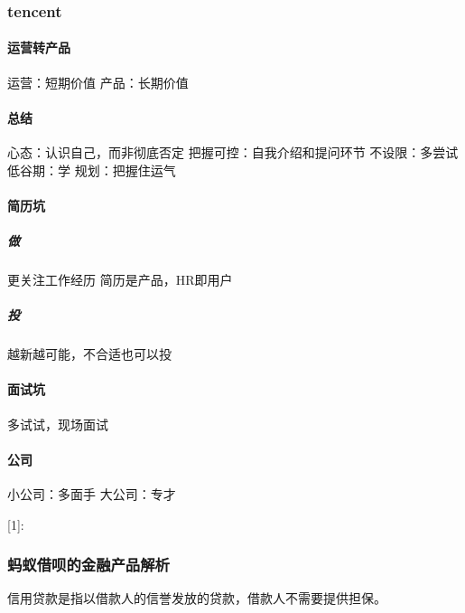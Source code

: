 \documentclass[letterpaper,11pt,english]{sphinxmanual}
\begin{document}
\subsubsection{tencent}
\label{\detokenize{chapter_experience/tencent:tencent}}\label{\detokenize{chapter_experience/tencent::doc}}

\paragraph{运营转产品}
\label{\detokenize{chapter_experience/tencent:id1}}
运营：短期价值 产品：长期价值


\paragraph{总结}
\label{\detokenize{chapter_experience/tencent:id2}}
心态：认识自己，而非彻底否定 把握可控：自我介绍和提问环节 不设限：多尝试
低谷期：学 规划：把握住运气


\paragraph{简历坑}
\label{\detokenize{chapter_experience/tencent:id3}}

\subparagraph{做}
\label{\detokenize{chapter_experience/tencent:id4}}
更关注工作经历 简历是产品，HR即用户


\subparagraph{投}
\label{\detokenize{chapter_experience/tencent:id5}}
越新越可能，不合适也可以投


\paragraph{面试坑}
\label{\detokenize{chapter_experience/tencent:id6}}
多试试，现场面试


\paragraph{公司}
\label{\detokenize{chapter_experience/tencent:id7}}
小公司：多面手 大公司：专才

{[}1{]}: %
\begin{footnote}[618]\sphinxAtStartFootnote
{}
%
\end{footnote}


\subsubsection{蚂蚁借呗的金融产品解析}
\label{\detokenize{chapter_experience/ant_jiebei:id1}}\label{\detokenize{chapter_experience/ant_jiebei::doc}}
信用贷款是指以借款人的信誉发放的贷款，借款人不需要提供担保。
\end{document}
